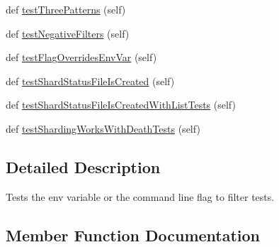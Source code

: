 \begin{DoxyCompactItemize}
\item 
def \mbox{\hyperlink{classgoogletest-master_1_1googletest_1_1test_1_1googletest-filter-unittest_1_1_g_test_filter_unit_test_ab7b6c82de9ff696ce724136e8cf7fa99}{test\+Three\+Patterns}} (self)
\item 
def \mbox{\hyperlink{classgoogletest-master_1_1googletest_1_1test_1_1googletest-filter-unittest_1_1_g_test_filter_unit_test_ad792412e6c38c3f8d62453daa012b1f9}{test\+Negative\+Filters}} (self)
\item 
def \mbox{\hyperlink{classgoogletest-master_1_1googletest_1_1test_1_1googletest-filter-unittest_1_1_g_test_filter_unit_test_ae73b44207c17e2442b451f455f62eedc}{test\+Flag\+Overrides\+Env\+Var}} (self)
\item 
def \mbox{\hyperlink{classgoogletest-master_1_1googletest_1_1test_1_1googletest-filter-unittest_1_1_g_test_filter_unit_test_ad249c5e3edf98eb3f3e24b5f765f92fc}{test\+Shard\+Status\+File\+Is\+Created}} (self)
\item 
def \mbox{\hyperlink{classgoogletest-master_1_1googletest_1_1test_1_1googletest-filter-unittest_1_1_g_test_filter_unit_test_aaf205fefb884434c1140d9c68721aa81}{test\+Shard\+Status\+File\+Is\+Created\+With\+List\+Tests}} (self)
\item 
def \mbox{\hyperlink{classgoogletest-master_1_1googletest_1_1test_1_1googletest-filter-unittest_1_1_g_test_filter_unit_test_a6d09cc2069c66b44504005cc948f2a02}{test\+Sharding\+Works\+With\+Death\+Tests}} (self)
\end{DoxyCompactItemize}


\subsection{Detailed Description}
\begin{DoxyVerb}Tests the env variable or the command line flag to filter tests.\end{DoxyVerb}
 

\subsection{Member Function Documentation}
\mbox{\label{classgoogletest-master_1_1googletest_1_1test_1_1googletest-filter-unittest_1_1_g_test_filter_unit_test_a4bfac6c852620e9231615e110e28f5a3}} 
